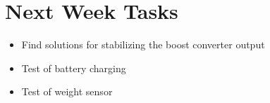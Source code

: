 \section{Next Week Tasks}
\label{sec:nextWeekTasks}

\begin{itemize}
\item Find solutions for stabilizing the boost converter output
\item Test of battery charging
\item Test of weight sensor
\end{itemize}

